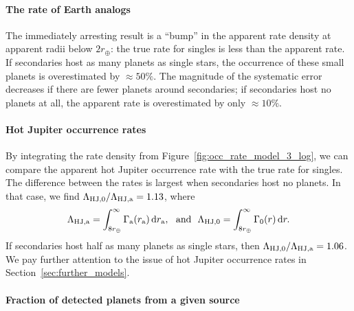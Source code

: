 \documentclass[12pt,modern]{aastex61}
\renewcommand{\a}{_{\rm a}}
\begin{document}
\paragraph{The rate of Earth analogs} The immediately arresting result
is a ``bump'' in the apparent rate density at apparent radii below
$2r_\oplus$: the true rate for singles is less than the apparent rate.
If secondaries host as many planets as single stars, the occurrence of
these small planets is overestimated by $\approx 50\%$.  The magnitude
of the systematic error decreases if there are fewer planets around
secondaries; if secondaries host no planets at all, the apparent rate
is overestimated by only $\approx 10\%$.  

\paragraph{Hot Jupiter occurrence rates}
By integrating the rate density from
Figure~\ref{fig:occ_rate_model_3_log}, we can compare the apparent hot
Jupiter occurrence rate with the true rate for singles.  The
difference between the rates is largest when secondaries host no
planets. In that case, we find $\Lambda_{{\rm HJ},0}/\Lambda_{\rm
HJ,a} = 1.13$, where
\begin{equation}
    \Lambda_{\rm HJ,a} =
      \int_{8r_\oplus}^{\infty} \Gamma\a(r\a)\,{\rm d}r\a,~~{\rm
      and}~~
    \Lambda_{\rm HJ,0} =
      \int_{8r_\oplus}^{\infty} \Gamma_0(r)\,{\rm d}r.
\end{equation}
If secondaries host half as many planets as single stars, then
$\Lambda_{{\rm HJ},0}/\Lambda_{\rm HJ,a} = 1.06$.  We pay further
attention to the issue of hot Jupiter occurrence rates in
Section~\ref{sec:further_models}.

\paragraph{Fraction of detected planets from a given source}
\end{document}
